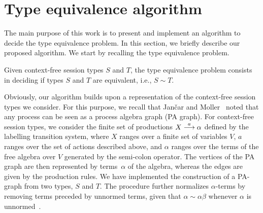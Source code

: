 
\section{Type equivalence algorithm}
\label{sec:algorithm}

The main purpose of this work is to present and implement an algorithm to decide the type equivalence problem. In this section, we briefly describe our proposed algorithm. We start by recalling the type equivalence problem.

\begin{definition}
	Given context-free session types $S$ and $T$, the type equivalence problem consists in deciding if types $S$ and $T$ are equivalent, i.e., $S\sim T$.
\end{definition}

Obviously, our algorithm builds upon a representation of the
context-free session types we consider. For this purpose, we recall
that Jan{\v{c}}ar and Moller~\cite{janvcar1999techniques} noted that
any process can be seen as a process algebra graph (PA graph). For
context-free session types, we consider the finite set of
productions $X \stackrel{a}{\longrightarrow} \alpha$ defined by the labelling transition
system, where $X$ ranges over a finite set of variables $V$, $a$
ranges over the set of actions described above, and $\alpha$ ranges over
the terms of the free algebra over $V$ generated by the semi-colon
operator.
The vertices of the PA graph are then represented by terms~$\alpha$ of
the algebra, whereas the edges are given by the production rules.
%
We have implemented the construction of a PA-graph from two types, $S$
and $T$. The procedure further normalizes $\alpha$-terms by removing
terms preceded by unnormed terms, given that $\alpha \sim \alpha\beta$
whenever $\alpha$ is unnormed~\cite{janvcar1999techniques}.

